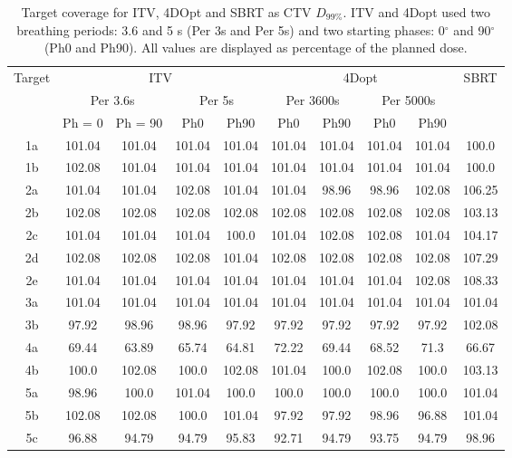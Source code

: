 \begin{table}[H]
  \centering
  \caption{Target coverage for ITV, 4DOpt and SBRT as CTV $D_{99\%}$. ITV and 4Dopt used two breathing periods: 3.6 and 5 s (Per 3s and Per 5s) and
  two starting phases: 0$^\circ$ and 90$^\circ$ (Ph0 and Ph90). All values are displayed as percentage of the planned dose.}
  \begin{tabular}{|c|c|c|c|c|c|c|c|c|c|} \hline
 \multirow{3}{*}{Target} & \multicolumn{4}{|c|}{ITV} & \multicolumn{4}{|c|}{4Dopt} & \multirow{3}{*}{SBRT}\\
  & \multicolumn{2}{|c|}{Per 3.6s} & \multicolumn{2}{|c|}{Per 5s} & \multicolumn{2}{|c|}{Per 3600s} & \multicolumn{2}{|c|}{Per 5000s} & \\
  & Ph = 0 & Ph = 90 & Ph0 & Ph90 & Ph0 & Ph90 & Ph0 & Ph90 & \\
 \hline \hline 
1a & 101.04 & 101.04 & 101.04 & 101.04 & 101.04 & 101.04 & 101.04 & 101.04 & 100.0 \\ 
 1b & 102.08 & 101.04 & 101.04 & 101.04 & 101.04 & 101.04 & 101.04 & 101.04 & 100.0 \\ 
  \hline 
2a & 101.04 & 101.04 & 102.08 & 101.04 & 101.04 & 98.96 & 98.96 & 102.08 & 106.25 \\ 
 2b & 102.08 & 102.08 & 102.08 & 102.08 & 102.08 & 102.08 & 102.08 & 102.08 & 103.13 \\ 
 2c & 101.04 & 101.04 & 101.04 & 100.0 & 101.04 & 102.08 & 102.08 & 101.04 & 104.17 \\ 
 2d & 102.08 & 102.08 & 102.08 & 101.04 & 102.08 & 102.08 & 102.08 & 102.08 & 107.29 \\ 
 2e & 101.04 & 101.04 & 101.04 & 101.04 & 101.04 & 101.04 & 101.04 & 102.08 & 108.33 \\ 
  \hline 
3a & 101.04 & 101.04 & 101.04 & 101.04 & 101.04 & 101.04 & 101.04 & 101.04 & 101.04 \\ 
 3b & 97.92 & 98.96 & 98.96 & 97.92 & 97.92 & 97.92 & 97.92 & 97.92 & 102.08 \\ 
  \hline 
4a & 69.44 & 63.89 & 65.74 & 64.81 & 72.22 & 69.44 & 68.52 & 71.3 & 66.67 \\ 
 4b & 100.0 & 102.08 & 100.0 & 102.08 & 101.04 & 100.0 & 102.08 & 100.0 & 103.13 \\ 
  \hline 
5a & 98.96 & 100.0 & 101.04 & 100.0 & 100.0 & 100.0 & 100.0 & 100.0 & 101.04 \\ 
 5b & 102.08 & 102.08 & 100.0 & 101.04 & 97.92 & 97.92 & 98.96 & 96.88 & 101.04 \\ 
 5c & 96.88 & 94.79 & 94.79 & 95.83 & 92.71 & 94.79 & 93.75 & 94.79 & 98.96 \\ 

\end{tabular}
\end{table}
